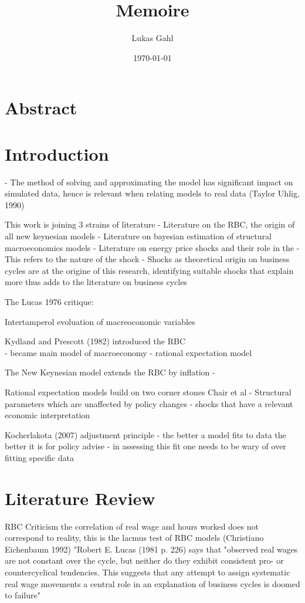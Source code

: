 \documentclass[12pt,a4paper,english]{article} %
\author{Lukas Gahl}
\title{\textbf{\huge Memoire }\\}
\date{\today}
\let\oldsection\section
\renewcommand\section{\clearpage\oldsection}
\begin{document}
	
	
	\maketitle
	\pagebreak

	\section*{Abstract}
	\pagebreak

	
	\tableofcontents
	\pagebreak
	
	
	 \section{Introduction}
	 
	- The method of solving and approximating the model has significant impact on simulated data, hence is relevant when relating models to real data (Taylor  Uhlig, 1990)
	
	This work is joining 3 strains of literature
	- Literature on the RBC, the origin of all new keynesian models
	- Literature on bayesian estimation of structural macroeconomics models
	- Literature on energy price shocks and their role in the 
		- This refers to the nature of the shock
		- Shocks as theoretical origin on business cycles are at the origine of this research, 
		identifying suitable shocks that explain more thus adds to the literature on business cycles
	
	The Lucas 1976 critique: 
	
	Intertamperol evoluation of macreoconomic variables
	
	Kydland and Prescott (1982) introduced the RBC \\
	- became main model of macroeconomy
	- rational expectation model
	
	The New Keynesian model extends the RBC by inflation
	- 
	
	Rational expectation models build on two corner stones Chair et al
	- Structural parameters which are unaffected by policy changes
	- shocks that have a relevant economic interpretation
	
	Kocherlakota (2007) adjustment principle
	- the better a model fits to data the better it is for policy advise
	- in assessing this fit one needs to be wary of over fitting specific data
	
	\section{Literature Review}
		RBC Criticism
	the correlation of real wage and hours worked does not correspond to reality, this is the lacmus test of RBC models (Christiano Eichenbaum 1992)
	"Robert E. Lucas (1981 p. 226) says that "observed real wages are not constant over the cycle, but neither do they exhibit consistent pro- or countercyclical tendencies. This suggests that any attempt to assign systematic real wage movements a central role in an explanation of business cycles is doomed to failure" \cite{christiano_current_1992}
	
\end{document}
